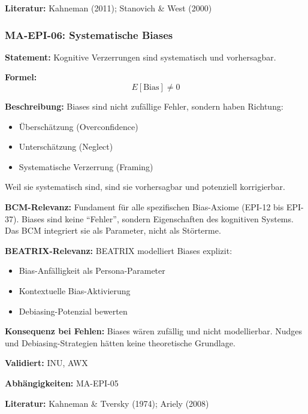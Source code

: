 \textbf{Literatur:} Kahneman (2011); Stanovich \& West (2000)


\subsubsection*{MA-EPI-06: Systematische Biases}

\textbf{Statement:} Kognitive Verzerrungen sind systematisch und vorhersagbar.

\textbf{Formel:}
\begin{equation}
E[\text{Bias}] \neq 0
\end{equation}

\textbf{Beschreibung:}
Biases sind nicht zufällige Fehler, sondern haben Richtung:
\begin{itemize}
    \item Überschätzung (Overconfidence)
    \item Unterschätzung (Neglect)
    \item Systematische Verzerrung (Framing)
\end{itemize}
Weil sie systematisch sind, sind sie vorhersagbar und potenziell korrigierbar.

\textbf{BCM-Relevanz:}
Fundament für alle spezifischen Bias-Axiome (EPI-12 bis EPI-37). Biases sind keine ``Fehler'', sondern Eigenschaften des kognitiven Systems. Das BCM integriert sie als Parameter, nicht als Störterme.

\textbf{BEATRIX-Relevanz:}
BEATRIX modelliert Biases explizit:
\begin{itemize}
    \item Bias-Anfälligkeit als Persona-Parameter
    \item Kontextuelle Bias-Aktivierung
    \item Debiasing-Potenzial bewerten
\end{itemize}

\textbf{Konsequenz bei Fehlen:}
Biases wären zufällig und nicht modellierbar. Nudges und Debiasing-Strategien hätten keine theoretische Grundlage.

\textbf{Validiert:} INU, AWX

\textbf{Abhängigkeiten:} MA-EPI-05

\textbf{Literatur:} Kahneman \& Tversky (1974); Ariely (2008)


